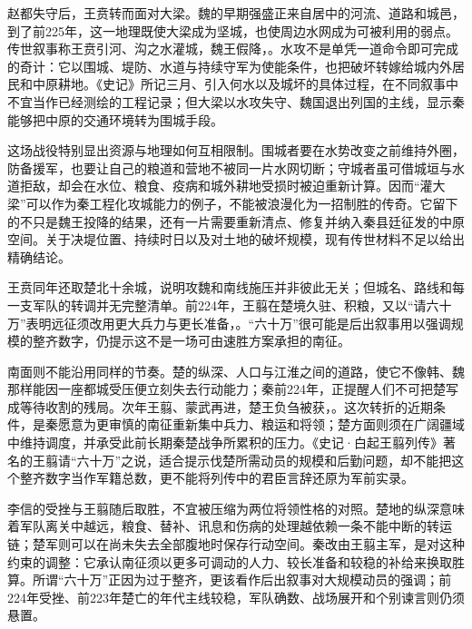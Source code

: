 赵都失守后，王贲转而面对大梁。魏的早期强盛正来自居中的河流、道路和城邑，到了前225年，这一地理既使大梁成为坚城，也使周边水网成为可被利用的弱点。传世叙事称王贲引河、沟之水灌城，魏王假降，。水攻不是单凭一道命令即可完成的奇计：它以围城、堤防、水道与持续守军为使能条件，也把破坏转嫁给城内外居民和中原耕地。《史记》所记三月、引入何水以及城坏的具体过程，在不同叙事中不宜当作已经测绘的工程记录；但大梁以水攻失守、魏国退出列国的主线，显示秦能够把中原的交通环境转为围城手段。

这场战役特别显出资源与地理如何互相限制。围城者要在水势改变之前维持外圈，防备援军，也要让自己的粮道和营地不被同一片水网切断；守城者虽可借城垣与水道拒敌，却会在水位、粮食、疫病和城外耕地受损时被迫重新计算。因而“灌大梁”可以作为秦工程化攻城能力的例子，不能被浪漫化为一招制胜的传奇。它留下的不只是魏王投降的结果，还有一片需要重新清点、修复并纳入秦县廷征发的中原空间。关于决堤位置、持续时日以及对土地的破坏规模，现有传世材料不足以给出精确结论。

王贲同年还取楚北十余城，说明攻魏和南线施压并非彼此无关；但城名、路线和每一支军队的转调并无完整清单。前224年，王翦在楚境久驻、积粮，又以“请六十万”表明远征须改用更大兵力与更长准备，。“六十万”很可能是后出叙事用以强调规模的整齐数字，仍提示这不是一场可由速胜方案承担的南征。

南面则不能沿用同样的节奏。楚的纵深、人口与江淮之间的道路，使它不像韩、魏那样能因一座都城受压便立刻失去行动能力；秦前224年，正提醒人们不可把楚写成等待收割的残局。次年王翦、蒙武再进，楚王负刍被获，。这次转折的近期条件，是秦愿意为更审慎的南征重新集中兵力、粮运和将领；楚方面则须在广阔疆域中维持调度，并承受此前长期秦楚战争所累积的压力。《史记·白起王翦列传》著名的王翦请“六十万”之说，适合提示伐楚所需动员的规模和后勤问题，却不能把这个整齐数字当作军籍总数，更不能将列传中的君臣言辞还原为军前实录。

李信的受挫与王翦随后取胜，不宜被压缩为两位将领性格的对照。楚地的纵深意味着军队离关中越远，粮食、替补、讯息和伤病的处理越依赖一条不能中断的转运链；楚军则可以在尚未失去全部腹地时保存行动空间。秦改由王翦主军，是对这种约束的调整：它承认南征须以更多可调动的人力、较长准备和较稳的补给来换取胜算。所谓“六十万”正因为过于整齐，更该看作后出叙事对大规模动员的强调；前224年受挫、前223年楚亡的年代主线较稳，军队确数、战场展开和个别谏言则仍须悬置。

